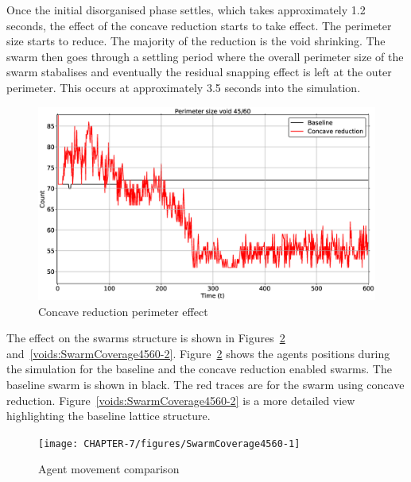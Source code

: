 Once the initial disorganised phase settles, which takes approximately 1.2 seconds, the effect of the concave reduction starts to take effect. The perimeter size starts to reduce. The majority of the reduction is the void shrinking. The swarm then goes through a settling period where the overall perimeter size of the swarm stabalises and eventually the residual snapping effect is left at the outer perimeter. This occurs at approximately 3.5 seconds into the simulation. 
\begin{figure}[H]
\begin{center}
\includegraphics[width=15cm]{CHAPTER-7/figures/ConcavePerimeter4560-1}
\end{center}
\caption{Concave reduction perimeter effect\label{methods:ConcavePerimeter4560-1}}
\end{figure}

The effect on the swarms structure is shown in Figures~\ref{voids:SwarmCoverage4560-1} and~\ref{voids:SwarmCoverage4560-2}. Figure~\ref{voids:SwarmCoverage4560-1} shows the agents positions during the simulation for the baseline and the concave reduction enabled swarms. The baseline swarm is shown in black. The red traces are for the swarm using concave reduction. Figure~\ref{voids:SwarmCoverage4560-2} is a more detailed view highlighting the baseline lattice structure.
\begin{figure}[H]
\begin{center}
\texttt{[image: CHAPTER-7/figures/SwarmCoverage4560-1]}
\end{center}
\caption{Agent movement comparison\label{voids:SwarmCoverage4560-1}}
\end{figure}

